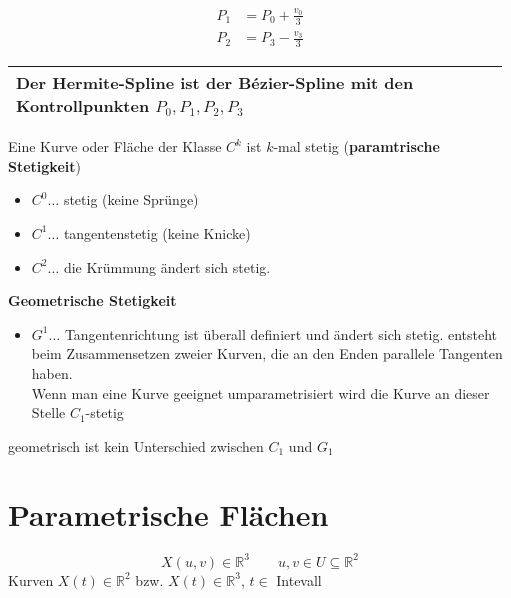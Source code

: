 \begin{align*}
 P_1 &= P_0 + \frac{v_0}{3}\\
 P_2 &= P_3 - \frac{v_3}{3}
\end{align*}
\begin{center}
\end{center}
\begin{center}
 \begin{tabular}{|p{0.98\linewidth}|}
  \hline
  Der Hermite-Spline ist der Bézier-Spline mit den Kontrollpunkten $P_0, P_1, P_2, P_3$\\
  \hline
 \end{tabular}
\end{center}

\Satz Eine Kurve oder Fläche der Klasse $C^k$ ist $k$-mal stetig (\textbf{paramtrische Stetigkeit})
	\begin{itemize}
	 \item $C^0 \dots$ stetig (keine Sprünge)
	 \item $C^1 \dots$ tangentenstetig (keine Knicke)
	 \item $C^2 \dots$ die Krümmung ändert sich stetig.
	\end{itemize}
\begin{center}
\end{center}
\Defi \textbf{Geometrische Stetigkeit}
\begin{itemize}
 \item $G^1 \dots$ Tangentenrichtung ist überall definiert und ändert sich stetig.
	entsteht beim Zusammensetzen zweier Kurven, die an den Enden parallele Tangenten haben.\\
	Wenn man eine Kurve geeignet umparametrisiert wird die Kurve an dieser Stelle $C_1$-stetig
\end{itemize}
geometrisch ist kein Unterschied zwischen $C_1$ und $G_1$

\section{Parametrische Flächen}
\[X(u,v) \in \mathbb{R}^3 \qquad u, v \in U \subseteq \mathbb{R}^2\]
Kurven $X(t) \in \mathbb{R}^2$ bzw. $X(t) \in \mathbb{R}^3$, $t \in$ Intevall
